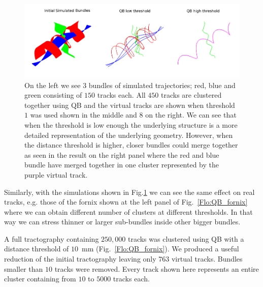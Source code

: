 \documentclass[journal]{IEEEtran}
\begin{document}
\begin{figure}
\begin{centering}
\includegraphics[scale=0.5]{Fig_5_helix_phantom}
\par\end{centering}
\caption{On the left we see $3$ bundles of simulated trajectories; red,
  blue and green consisting of $150$ tracks each. All $450$ tracks are
  clustered together using QB and the virtual tracks are shown when
  threshold $1$ was used shown in the middle and $8$ on the right.  We
  can see that when the threshold is low enough the underlying structure
  is a more detailed representation of the underlying geometry. However,
  when the distance threshold is higher, closer bundles could merge
  together as seen in the result on the right panel where the red and
  blue bundle have merged together in one cluster represented by the
  purple virtual track.\label{Flo:simulated_orbits}}
\end{figure}

Similarly, with the simulations shown in Fig.\ref{Flo:simulated_orbits}
we can see the same effect on real tracks, e.g. those of the fornix
shown at the left panel of Fig.~\ref{Flo:QB_fornix} where we can obtain
different number of clusters at different thresholds. In that way we can
stress thinner or larger sub-bundles inside other bigger bundles. 

A full tractography containing $250,000$ tracks was clustered using QB
with a distance threshold of $10$~mm (Fig.~\ref{Flo:QB_fornix}).  We
produced a useful reduction of the initial tractography leaving only
$763$ virtual tracks. Bundles smaller than $10$ tracks were
removed. Every track shown here represents an entire cluster containing
from $10$ to $5000$ tracks each.
\end{document}
